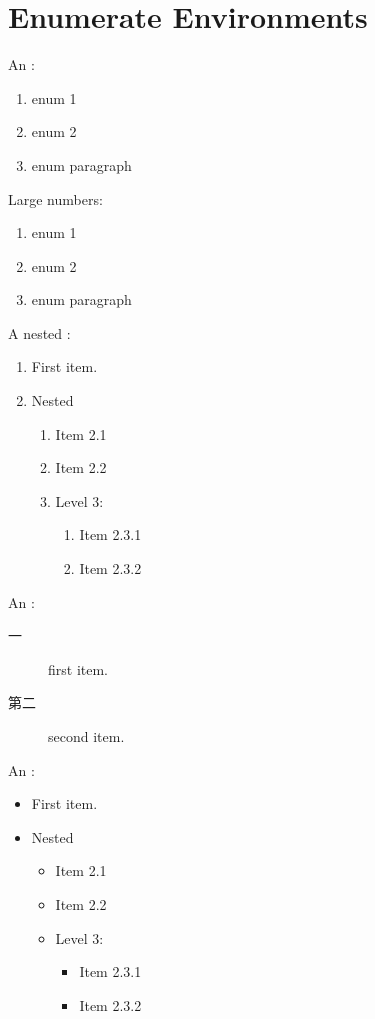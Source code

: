 \documentclass[showbib, lang=zh]{DeanReport}
\begin{document}
\section{Enumerate Environments}
An :
\begin{enumerate}
    \item enum 1
    \item enum 2
    \item enum paragraph \lipsum[2]
\end{enumerate}
Large numbers:
\begin{enumerate}[start=9]
    \item enum 1
    \item enum 2
    \item enum paragraph \lipsum[2]
\end{enumerate}

A nested :
\begin{enumerate}
    \item First item.
    \item Nested 
    \begin{enumerate}
        \item Item 2.1
        \item Item 2.2
        \item Level 3:
        \begin{enumerate}
            \item Item 2.3.1
            \item Item 2.3.2
        \end{enumerate}
    \end{enumerate}
\end{enumerate}

An :
\begin{description}
    \item[一] first item.
    \item[第二] second item.
\end{description}

An :
\begin{itemize}
    \item First item.
    \item Nested 
    \begin{itemize}
        \item Item 2.1
        \item Item 2.2
        \item Level 3:
        \begin{itemize}
            \item Item 2.3.1
            \item Item 2.3.2
        \end{itemize}
    \end{itemize}
\end{itemize}
\end{document}

